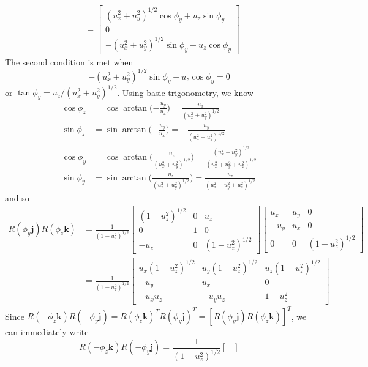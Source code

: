 \documentclass[../principles-of-quantum-mechanics.tex]{subfiles}
\begin{document}
\begin{questions}
\begin{solution}
\begin{align*}
			&= \begin{bmatrix}
				(u_x^2 + u_y^2)^{1/2}\cos\phi_y + u_z\sin\phi_y \\ 0 \\ -(u_x^2 + u_y^2)^{1/2}\sin\phi_y + u_z\cos\phi_y
			\end{bmatrix}
		\end{align*}
		The second condition is met when
		$$-(u_x^2 + u_y^2)^{1/2}\sin\phi_y + u_z\cos\phi_y = 0$$
		or $\tan\phi_y = u_z/(u_x^2 + u_y^2)^{1/2}$. Using basic trigonometry, we know
		\begin{align*}
			\cos\phi_z &= \cos\arctan\Big({-\frac{u_y}{u_x}}\Big) = \frac{u_x}{(u_x^2 + u_y^2)^{1/2}} \\
			\sin\phi_z &= \sin\arctan\Big({-\frac{u_y}{u_x}}\Big) = {-\frac{u_y}{(u_x^2 + u_y^2)^{1/2}}} \\
			\cos\phi_y &= \cos\arctan\Big(\frac{u_z}{(u_x^2 + u_y^2)^{1/2}}\Big) = \frac{(u_x^2 + u_y^2)^{1/2}}{(u_x^2 + u_y^2 + u_z^2)^{1/2}} \\
			\sin\phi_y &= \sin\arctan\Big(\frac{u_z}{(u_x^2 + u_y^2)^{1/2}}\Big) = \frac{u_z}{(u_x^2 + u_y^2 + u_z^2)^{1/2}}
		\end{align*}
		and so
		\begin{align*}
			R(\phi_y\mathbf{j})R(\phi_z\mathbf{k}) &= \frac{1}{(1 - u_z^2)^{1/2}}\begin{bmatrix}
				(1 - u_z^2)^{1/2} & 0 & u_z \\
				0 & 1 & 0 \\
				-u_z & 0 & (1 - u_z^2)^{1/2}
			\end{bmatrix}\begin{bmatrix}
				u_x & u_y & 0 \\
				-u_y & u_x & 0 \\
				0 & 0 & (1 - u_z^2)^{1/2}
			\end{bmatrix} \\
			&= \frac{1}{(1 - u_z^2)^{1/2}}\begin{bmatrix}
				u_x(1 - u_z^2)^{1/2} & u_y(1 - u_z^2)^{1/2} & u_z(1 - u_z^2)^{1/2} \\
				-u_y & u_x & 0 \\
				-u_xu_z & -u_yu_z & 1 - u_z^2
			\end{bmatrix}
		\end{align*}
		Since $R(-\phi_z\mathbf{k})R(-\phi_y\mathbf{j}) =  R(\phi_z\mathbf{k})^TR(\phi_y\mathbf{j})^T = [R(\phi_y\mathbf{j})R(\phi_z\mathbf{k})]^T$, we can immediately write
		$$R(-\phi_z\mathbf{k})R(-\phi_y\mathbf{j}) = \frac{1}{(1 - u_z^2)^{1/2}}\begin{bmatrix}

\end{bmatrix}$$
\end{solution}
\end{questions}
\end{document}
